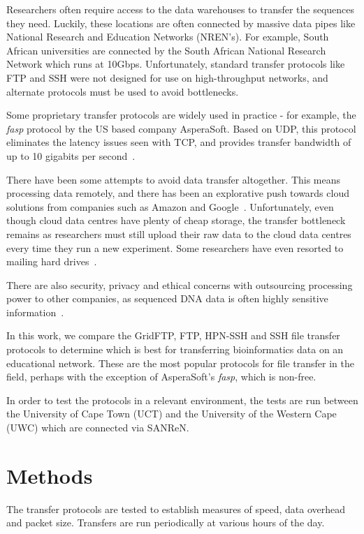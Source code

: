 \documentclass{sig-alternate-05-2015}
\begin{document}
Researchers often require access to the data warehouses to transfer the sequences they need. Luckily, these locations are often connected by massive data pipes like National Research and Education Networks (NREN's). For example, South African universities are connected by the South African National Research Network \cite{sanren} which runs at 10Gbps. Unfortunately, standard transfer protocols like FTP and SSH were not designed for use on high-throughput networks, and alternate protocols must be used to avoid bottlenecks.

Some proprietary transfer protocols are widely used in practice - for example, the \textit{fasp} protocol by the US based company AsperaSoft. Based on UDP, this protocol eliminates the latency issues seen with TCP, and provides transfer bandwidth of up to 10 gigabits per second~\cite{beloslyudtsev2014aspera}.

There have been some attempts to avoid data transfer altogether. This means processing data remotely, and there has been an explorative push towards cloud solutions from companies such as Amazon and Google~\cite{baker2010next}. Unfortunately, even though cloud data centres have plenty of cheap storage, the transfer bottleneck remains as researchers must still upload their raw data to the cloud data centres every time they run a new experiment. Some researchers have even resorted to mailing hard drives~\cite{baker2010next}.

There are also security, privacy and ethical concerns with outsourcing processing power to other companies, as sequenced DNA data is often highly sensitive information~\cite{marx2013biology}.

In this work, we compare the GridFTP, FTP, HPN-SSH and SSH file transfer protocols to determine which is best for transferring bioinformatics data on an educational network. These are the most popular protocols for file transfer in the field, perhaps with the exception of AsperaSoft's \textit{fasp}, which is non-free. 

In order to test the protocols in a relevant environment, the tests are run between the University of Cape Town (UCT) and the University of the Western Cape (UWC) which are connected via SANReN.

\section{Methods}
The transfer protocols are tested to establish measures of speed, data overhead and packet size. Transfers are run periodically at various hours of the day.
\end{document}
